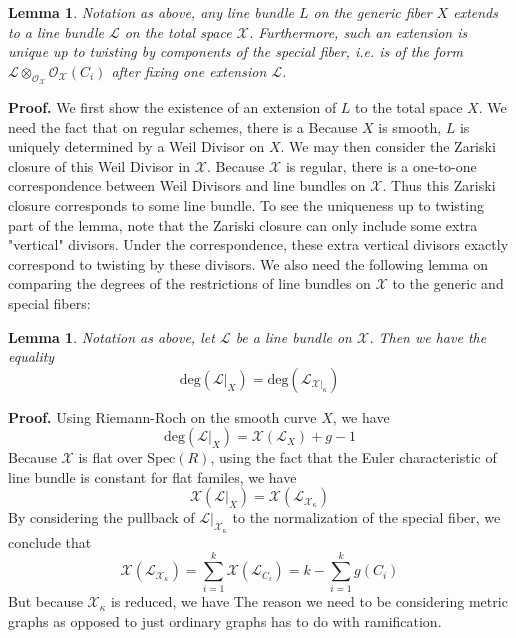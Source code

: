 \documentclass{article}
\newtheorem{lemma}[theorem]{Lemma}
\begin{document}
\begin{lemma}
Notation as above, any line bundle $L$ on the generic fiber $X$ extends to a line bundle $\mathcal{L}$ on the total space $\mathcal{X}$. Furthermore, such an extension is unique up to twisting by components of the special fiber, i.e. is of the form $\mathcal{L}\otimes_{\mathcal{O}_{\mathcal{X}}}\mathcal{O}_{\mathcal{X}}(C_i)$ after fixing one extension $\mathcal{L}$.  
\end{lemma}
\textbf{Proof.} We first show the existence of an extension of $L$ to the total space $X$. We need the fact that on regular schemes, there is a  Because $X$ is smooth, $L$ is uniquely determined by a Weil Divisor on $X$. We may then consider the Zariski closure of this Weil Divisor in $\mathcal{X}$. Because $\mathcal{X}$ is regular, there is a one-to-one correspondence between Weil Divisors and line bundles on $\mathcal{X}$. Thus this Zariski closure corresponds to some line bundle.
\newline
\newline
To see the uniqueness up to twisting part of the lemma, note that the Zariski closure can only include some extra "vertical" divisors. Under the correspondence, these extra vertical divisors exactly correspond to twisting by these divisors. 
\newline
\newline
We also need the following lemma on comparing the degrees of the restrictions of line bundles on $\mathcal{X}$ to the generic and special fibers:
\begin{lemma}
Notation as above, let $\mathcal{L}$ be a line bundle on $\mathcal{X}$. Then we have the equality
\[
\text{deg}(\mathcal{L}|_{X}) = \text{deg}(\mathcal{L}_{\mathcal{X}|_{\kappa}})
\]
\end{lemma}
\textbf{Proof.} Using Riemann-Roch on the smooth curve $X$, we have 
\[
\text{deg}(\mathcal{L}|_X)= \mathcal{X}(\mathcal{L}_X) + g - 1
\]
Because $\mathcal{X}$ is flat over $\text{Spec}(R)$, using the fact that the Euler characteristic of line bundle is constant for flat familes, we have 
\[
\mathcal{X}(\mathcal{L}|_X) = \mathcal{X}(\mathcal{L}_{\mathcal{X}_{\mathcal{\kappa}}})
\]
By considering the pullback of $\mathcal{L}|_{\mathcal{X}_{\kappa}}$ to the normalization of the special fiber, we conclude that 
\[
\mathcal{X}(\mathcal{L}_{\mathcal{X}_{\mathcal{\kappa}}}) = \sum_{i = 1}^{k}\mathcal{X}(\mathcal{L}_{C_i}) = k - 
\sum_{i = 1}^{k}g(C_i)
\]
\newline
\newline
But because $\mathcal{X}_{\kappa}$ is reduced, we have 
\newline
\newline
The reason we need to be considering metric graphs as opposed to just ordinary graphs has to do with ramification. 


\end{document}
